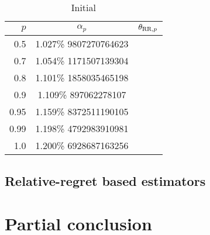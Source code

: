 \documentclass[../../Main_ManuscritThese.tex]{subfiles}
\newcommand\imgpath{/home/victor/acadwriting/Manuscrit/Text/Chapter5/img/}
\begin{document}
\begin{table}[!ht]
  \centering
  \begin{tabular}{rcl} \toprule
    $p$ & $\alpha_p$ & $\theta_{\mathrm{RR},p}$ \\ \midrule
    \num{0.5} & \num{1.027%
                } &   \\
    \num{0.7} & \num{1.054%
                } &  \\
    \num{0.8} & \num{1.101%
                } & \\
    \num{0.9} & \num{1.109%
                } & \\
    \num{0.95}& \num{1.159%
                } & \\
    \num{0.99}& \num{1.198%
                } & \\
    \num{1.0} & \num{1.200%
                } & \\ \bottomrule
  \end{tabular}
  \caption{Initial}
  \label{tab:initial_quantiles}
\end{table}

\subsection{Relative-regret based estimators}

\section{Partial conclusion}

%   

%   


\clearpage




\subfileLocal{
	\pagestyle{empty}
	
	
}
\end{document}
